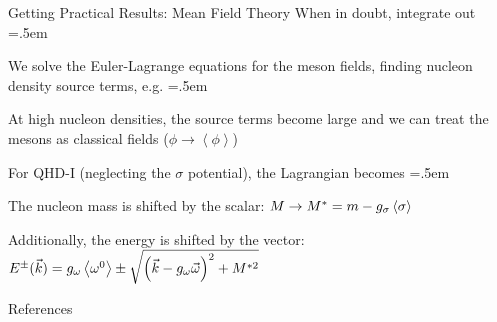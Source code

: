 \documentclass[xcolor={dvipsnames}]{beamer}
\let\olditemize=\itemize
\let\endolditemize=\enditemize
\renewenvironment{itemize}{\olditemize \itemsep=.5em }{\endolditemize}
\begin{document}
\begin{frame}{Getting Practical Results: Mean Field Theory}
\alert{When in doubt, integrate out}
\begin{itemize}
    \item<2-> We solve the Euler-Lagrange equations for the meson fields, finding nucleon density source terms, e.g.
\end{itemize}
\vspace{-1.25em}
\begin{itemize}
    \item<4-> At high nucleon densities, the source terms become large and we can treat the mesons as classical fields ($\phi \to \left<\phi\right>$)
    \item<5-> For QHD-I (neglecting the $\sigma$ potential), the Lagrangian becomes \cite{Serot1992}
\end{itemize}
\vspace{-1.25em}
\begin{itemize}
    \item<7-> The nucleon mass is shifted by the scalar: $M \to M^* = m - g_\sigma\ev{\sigma}$
    \item<8-> Additionally, the energy is shifted by the vector: $E^\pm(\vec{k}) = g_\omega\ev{\omega^0} \pm \sqrt{\left(\vec{k} - g_\omega\vec{\omega}\right)^2 + M^{*2}}$
\end{itemize}
\end{frame}

\begin{frame}{References}
    
    
\end{frame}
\end{document}
